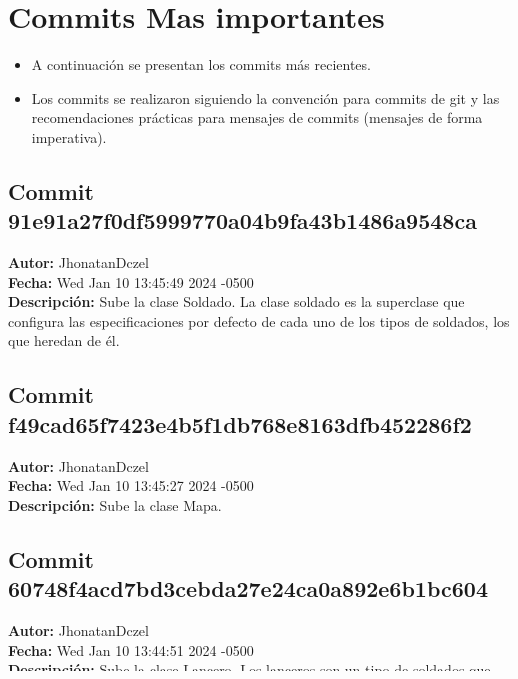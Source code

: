 
\section{Commits Mas importantes}
\begin{itemize}
    \item A continuación se presentan los commits más recientes.
    \item Los commits se realizaron siguiendo la convención para commits de git y las recomendaciones prácticas para mensajes de commits (mensajes de forma imperativa).
\end{itemize}

\subsection*{Commit 91e91a27f0df5999770a04b9fa43b1486a9548ca}
\textbf{Autor:} JhonatanDczel \\
\textbf{Fecha:} Wed Jan 10 13:45:49 2024 -0500 \\
\textbf{Descripción:} Sube la clase Soldado. La clase soldado es la superclase que configura las especificaciones por defecto de cada uno de los tipos de soldados, los que heredan de él.

\subsection*{Commit f49cad65f7423e4b5f1db768e8163dfb452286f2}
\textbf{Autor:} JhonatanDczel \\
\textbf{Fecha:} Wed Jan 10 13:45:27 2024 -0500 \\
\textbf{Descripción:} Sube la clase Mapa.

\subsection*{Commit 60748f4acd7bd3cebda27e24ca0a892e6b1bc604}
\textbf{Autor:} JhonatanDczel \\
\textbf{Fecha:} Wed Jan 10 13:44:51 2024 -0500 \\
\textbf{Descripción:} Sube la clase Lancero. Los lanceros son un tipo de soldados que tienen sus propios atributos y métodos específicos derivados de la clase Soldado.

\subsection*{Commit 0bf5a9f22e1764432171d50795054ad3f6cca534}
\textbf{Autor:} JhonatanDczel \\
\textbf{Fecha:} Wed Jan 10 13:44:18 2024 -0500 \\
\textbf{Descripción:} Sube la clase Espadachín. Contiene las especificaciones para este tipo de guerrero, así como sus atributos y métodos internos.

